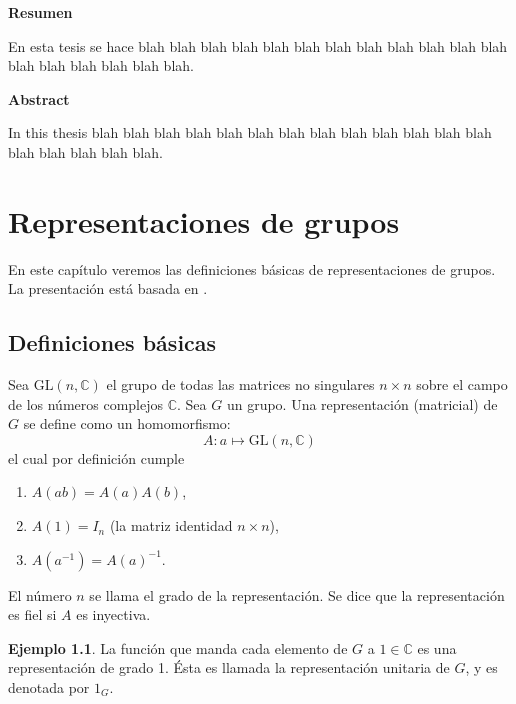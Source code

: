 \documentclass[12pt]{book}
\theoremstyle{definition}
\newtheorem{example}[theorem]{Ejemplo}
\newcounter{in}
\newcounter{ini}
\begin{document}
\thispagestyle{empty}
\begin{flushleft}
  {\bfseries\Large Resumen}
\end{flushleft}

En esta tesis se hace blah blah blah blah blah blah blah blah blah
blah blah blah blah blah blah blah blah blah.

\vspace{2cm}

\begin{flushleft}
  {\bfseries\Large Abstract}
\end{flushleft}

In this thesis blah blah blah blah blah blah blah blah blah
blah blah blah blah blah blah blah blah blah.

 \newpage \thispagestyle{empty}

\chapter{Representaciones de grupos}
\label{cha:Representaciones de grupos}

En este capítulo veremos las definiciones básicas de representaciones
de grupos. La presentación está basada en \cite{MR882540}.

\section{Definiciones básicas}
\label{sec:basicas}

Sea $ \mathrm{GL}(n,\mathbb{C})$ el grupo de todas las matrices no
singulares $n\times n$ sobre el campo de los números complejos
$\mathbb{C}$. Sea $G$ un grupo. Una representación (matricial) de $G$
se define como un homomorfismo:
\begin{equation*}
  A \colon a \mapsto \mathrm{GL}(n,\mathbb{C})
\end{equation*}
el cual por definición cumple
\begin{enumerate}
\item $A\left(ab\right)=A\left(a\right)A\left(b\right)$,
\item $A\left(1\right)=I_{n}$ (la matriz identidad $n\times n$),
\item $A\left(a^{-1}\right)=A\left(a\right)^{-1}$.
\end{enumerate}
El número $n$ se llama el grado de la representación. Se dice que la
representación es fiel si $A$ es inyectiva.

\begin{example}
  \label{Ej6}
  La función que manda cada elemento de $G$ a $1
  \in \mathbb{C}$ es una representación de grado 1. Ésta es llamada la
  representación unitaria de $G$, y es denotada por $1_{G}$. 
\end{example}
 
\end{document}
